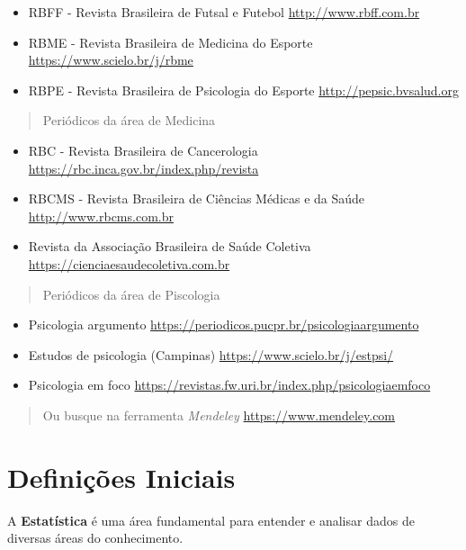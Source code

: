 \documentclass[
]{book}
\begin{document}
\begin{itemize}
\item
  RBFF - Revista Brasileira de Futsal e Futebol \url{http://www.rbff.com.br}
\item
  RBME - Revista Brasileira de Medicina do Esporte \url{https://www.scielo.br/j/rbme}
\item
  RBPE - Revista Brasileira de Psicologia do Esporte \url{http://pepsic.bvsalud.org}
\end{itemize}

\begin{quote}
Periódicos da área de Medicina
\end{quote}

\begin{itemize}
\item
  RBC - Revista Brasileira de Cancerologia \url{https://rbc.inca.gov.br/index.php/revista}
\item
  RBCMS - Revista Brasileira de Ciências Médicas e da Saúde \url{http://www.rbcms.com.br}
\item
  Revista da Associação Brasileira de Saúde Coletiva \url{https://cienciaesaudecoletiva.com.br}
\end{itemize}

\begin{quote}
Periódicos da área de Piscologia
\end{quote}

\begin{itemize}
\item
  Psicologia argumento \url{https://periodicos.pucpr.br/psicologiaargumento}
\item
  Estudos de psicologia (Campinas) \url{https://www.scielo.br/j/estpsi/}
\item
  Psicologia em foco \url{https://revistas.fw.uri.br/index.php/psicologiaemfoco}
\end{itemize}

\begin{quote}
Ou busque na ferramenta \emph{Mendeley} \url{https://www.mendeley.com}
\end{quote}

\chapter{Definições Iniciais}\label{definiuxe7uxf5es-iniciais}

A \textbf{Estatística} é uma área fundamental para entender e analisar dados de diversas áreas do conhecimento.
\end{document}
